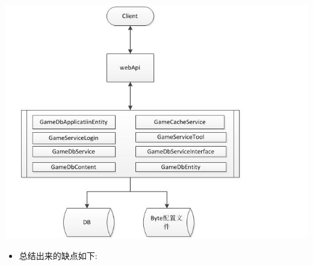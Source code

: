 \documentclass[9pt, b5paper]{article}
\begin{document}
\includegraphics[width=.9\linewidth]{./pic/server_20230103_220701.png}
\begin{itemize}
\item 总结出来的缺点如下:
\end{itemize}
\end{document}
